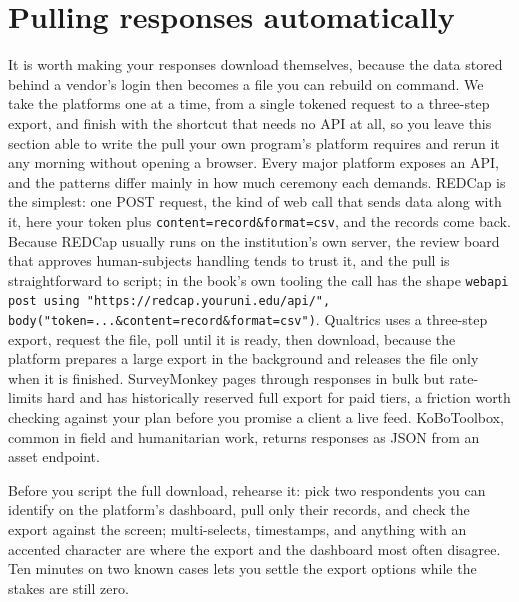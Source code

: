 \documentclass[
    a4paper,
    fontsize=10pt,
    twoside=true,
    numbers=noenddot,
]{kaobook}
\begin{document}
\section{Pulling responses automatically}
It is worth making your responses download themselves, because the data stored behind a vendor's login then becomes a file you can rebuild on command. We take the platforms one at a time, from a single tokened request to a three-step export, and finish with the shortcut that needs no API at all, so you leave this section able to write the pull your own program's platform requires and rerun it any morning without opening a browser. Every major platform exposes an API, and the patterns differ mainly in how much ceremony each demands. REDCap is the simplest: one POST request, the kind of web call that sends data along with it, here your token plus \texttt{content=record\&format=csv}, and the records come back. Because REDCap usually runs on the institution's own server, the review board that approves human-subjects handling tends to trust it, and the pull is straightforward to script; in the book's own tooling the call has the shape \texttt{webapi post using "https://redcap.youruni.edu/api/", body("token=...\&content=record\&format=csv")}. Qualtrics uses a three-step export, request the file, poll until it is ready, then download, because the platform prepares a large export in the background and releases the file only when it is finished. SurveyMonkey pages through responses in bulk but rate-limits hard and has historically reserved full export for paid tiers, a friction worth checking against your plan before you promise a client a live feed. KoBoToolbox, common in field and humanitarian work, returns responses as JSON from an asset endpoint.

Before you script the full download, rehearse it: pick two respondents you can identify on the platform's dashboard, pull only their records, and check the export against the screen; multi-selects, timestamps, and anything with an accented character are where the export and the dashboard most often disagree. Ten minutes on two known cases lets you settle the export options while the stakes are still zero.
\end{document}

